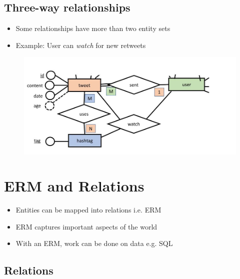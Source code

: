\documentclass[conference]{IEEEtran}
\begin{document}
\pagebreak

\subsection{Three-way relationships}

\begin{itemize}
    \item Some relationships have more than two entity sets
    \item Example: User can \textit{watch} for new retweets
\end{itemize}
\begin{figure} [h!]
    \centering
    \includegraphics[scale=0.4]{Ex13.JPG}
\end{figure}

\section{\textbf{ERM and Relations}}

\begin{itemize}
    \item Entities can be mapped into relations i.e. ERM
    \item ERM captures important aspects of the world
    \item With an ERM, work can be done on data e.g. SQL
\end{itemize}

\subsection{Relations}
\end{document}
